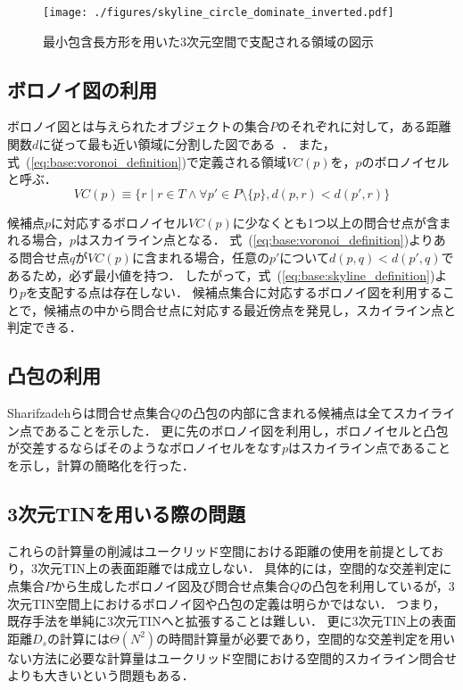 \documentclass{fit}
\theoremstyle{definition}
\newcommand{\Eq}[1]{式~(#1)}
\begin{document}
\begin{figure}[t]
  \centering
  \texttt{[image: ./figures/skyline\_circle\_dominate\_inverted.pdf]}
  \caption{最小包含長方形を用いた3次元空間で支配される領域の図示}
  \label{fig:skyline_circle_dominate}
\end{figure}

\subsection{ボロノイ図の利用}\label{subsec:existing-work-voronoi}

ボロノイ図とは与えられたオブジェクトの集合$P$のそれぞれに対して，ある距離関数$d$に従って最も近い領域に分割した図である~\cite{de1997computational}．
また，\Eq{\ref{eq:base:voronoi_definition}}で定義される領域$VC(p)$を，$p$のボロノイセルと呼ぶ．
\begin{equation}
  \label{eq:base:voronoi_definition}
  VC(p) \equiv \{ r \mid r \in T \wedge \forall p' \in P \setminus \{p\}, d(p,r) < d(p',r) \}
\end{equation}

候補点$p$に対応するボロノイセル$VC(p)$に少なくとも1つ以上の問合せ点が含まれる場合，$p$はスカイライン点となる．
\Eq{\ref{eq:base:voronoi_definition}}よりある問合せ点$q$が$VC(p)$に含まれる場合，任意の$p'$について$d(p,q)<d(p',q)$であるため，必ず最小値を持つ．
したがって，\Eq{\ref{eq:base:skyline_definition}}より$p$を支配する点は存在しない．
候補点集合に対応するボロノイ図を利用することで，候補点の中から問合せ点に対応する最近傍点を発見し，スカイライン点と判定できる．

\subsection{凸包の利用}
Sharifzadehらは問合せ点集合$Q$の凸包の内部に含まれる候補点は全てスカイライン点であることを示した．
更に先のボロノイ図を利用し，ボロノイセルと凸包が交差するならばそのようなボロノイセルをなす$p$はスカイライン点であることを示し，計算の簡略化を行った．

\subsection{3次元TINを用いる際の問題}

これらの計算量の削減はユークリッド空間における距離の使用を前提としており，3次元TIN上の表面距離では成立しない．
具体的には，空間的な交差判定に点集合$P$から生成したボロノイ図及び問合せ点集合$Q$の凸包を利用しているが，3次元TIN空間上におけるボロノイ図や凸包の定義は明らかではない．
つまり，既存手法を単純に3次元TINへと拡張することは難しい．
更に3次元TIN上の表面距離$D_s$の計算には$\Theta(N^2)$の時間計算量が必要であり，空間的な交差判定を用いない方法に必要な計算量はユークリッド空間における空間的スカイライン問合せよりも大きいという問題もある．
\end{document}
